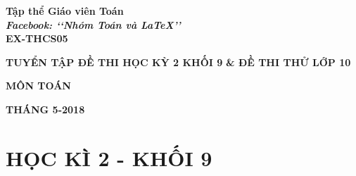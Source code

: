 \documentclass[12pt,a4paper,oneside]{book}
\renewcommand{\baselinestretch}{1.4}
\begin{document}
\providecommand*{\dx}{\ensuremath{\mathrm{\,d}}x}
\providecommand*{\unit}[1]{\ensuremath{\mathrm{\,#1}}}

\begin{titlepage}
\begin{center}
\fontsize{17}{0}\selectfont
\textbf{Tập thể Giáo viên Toán}\\
\textbf{\textit{Facebook: \lq\lq Nhóm Toán và LaTeX\rq\rq}}\\
\vspace{4cm}
\textbf{\fontsize{20}{0}\selectfont EX-THCS05}
\end{center}

\begin{center}

\vspace{1cm}

 \textbf{\fontsize{30}{0}\selectfont T\fontsize{25}{0}\selectfont UYỂN TẬP ĐỀ THI HỌC KỲ 2 KHỐI 9} \textbf{\fontsize{25}{0}\selectfont \& ĐỀ THI THỬ LỚP 10}
 
 \vspace{1cm}
 
 \textbf{\fontsize{35}{0}\selectfont MÔN TOÁN}\\ 
\end{center}


\vfill{
\begin{center}
\fontsize{17}{0}\textbf{THÁNG 5-2018}
\end{center}
}
\end{titlepage}
\renewcommand{\headrulewidth}{0.4pt}

{\renewcommand{\baselinestretch}{1.3}

	\newpage
\tableofcontents
}
\chapter{HỌC KÌ 2 - KHỐI 9}
	\newpage
	
	
	
	
	
	
	
	
	
	
	
	
	
			
		
	
	
	
	
	
	
	
	
\end{document}
